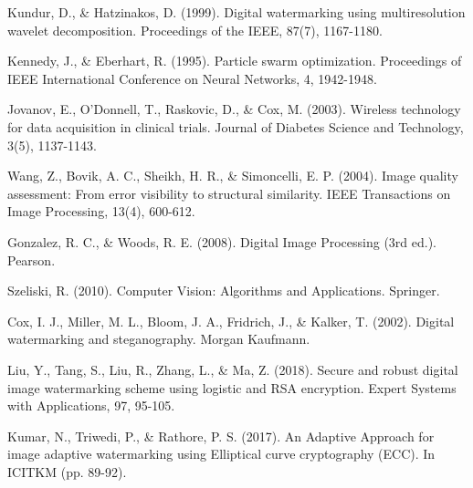 \documentclass[conference]{IEEEtran}
\begin{document}
\begin{thebibliography}{00}
 Kundur, D., \& Hatzinakos, D. (1999). Digital watermarking using multiresolution wavelet decomposition. Proceedings of the IEEE, 87(7), 1167-1180.


 Kennedy, J., \& Eberhart, R. (1995). Particle swarm optimization. Proceedings of IEEE International Conference on Neural Networks, 4, 1942-1948.

 Jovanov, E., O'Donnell, T., Raskovic, D., \& Cox, M. (2003). Wireless technology for data acquisition in clinical trials. Journal of Diabetes Science and Technology, 3(5), 1137-1143.

 Wang, Z., Bovik, A. C., Sheikh, H. R., \& Simoncelli, E. P. (2004). Image quality assessment: From error visibility to structural similarity. IEEE Transactions on Image Processing, 13(4), 600-612.

 Gonzalez, R. C., \& Woods, R. E. (2008). Digital Image Processing (3rd ed.). Pearson.

 Szeliski, R. (2010). Computer Vision: Algorithms and Applications. Springer.

 Cox, I. J., Miller, M. L., Bloom, J. A., Fridrich, J., \& Kalker, T. (2002). Digital watermarking and steganography. Morgan Kaufmann.

 Liu, Y., Tang, S., Liu, R., Zhang, L., & Ma, Z. (2018). Secure and robust digital image watermarking scheme using logistic and RSA encryption. Expert Systems with Applications, 97, 95-105.

 Kumar, N., Triwedi, P., & Rathore, P. S. (2017). An Adaptive Approach for image adaptive watermarking using Elliptical curve cryptography (ECC). In ICITKM (pp. 89-92).

\end{thebibliography}
\end{document}

